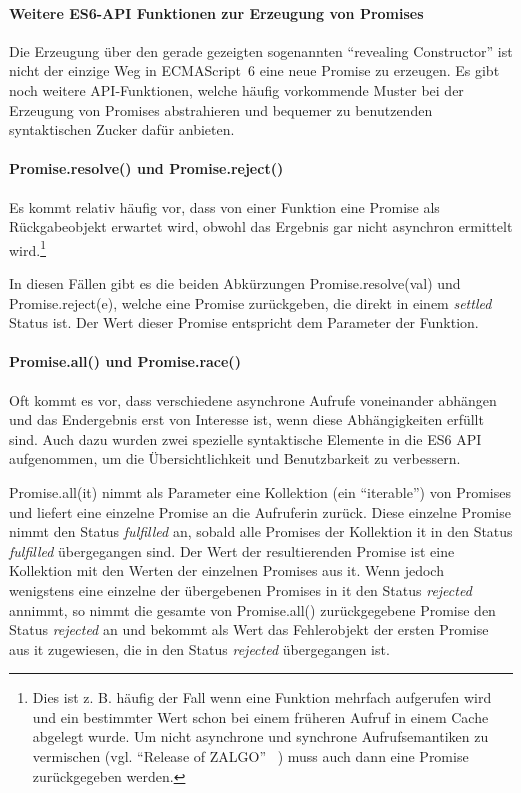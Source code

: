 \documentclass[
11pt, %
a4paper, %
oneside, %
pdfspacing, %
headinclude,
BCOR5mm, %
ngerman, %
bibtotocnumbered,
]{scrartcl}
\begin{document}
			\paragraph{Weitere ES6-API Funktionen zur Erzeugung von Promises}
			Die Erzeugung über den gerade gezeigten sogenannten "`re\-veal\-ing Constructor"' ist nicht der einzige Weg in ECMAScript~6 eine neue Promise zu erzeugen. Es gibt noch weitere API-Funktionen, welche häufig vorkommende Muster bei der Erzeugung von Promises abstrahieren und bequemer zu benutzenden syntaktischen Zucker dafür anbieten.
		
			\paragraph{\textsf{Promise.resolve()} und \textsf{Promise.reject()}} Es kommt relativ häufig vor, dass von einer Funktion eine Promise als Rückgabeobjekt erwartet wird, obwohl das Ergebnis gar nicht asynchron ermittelt wird.\footnote{Dies ist z. B. häufig der Fall wenn eine Funktion mehrfach aufgerufen wird und ein bestimmter Wert schon bei einem früheren Aufruf in einem Cache abgelegt wurde. Um nicht asynchrone und synchrone Aufrufsemantiken zu vermischen (vgl. "`Release of ZALGO"' ~\citep{Schlueter.2013}) muss auch dann eine Promise zurückgegeben werden.}
			
			In diesen Fällen gibt es die beiden Abkürzungen \textsf{Promise.resolve(val)} und \textsf{Promise.reject(e)}, welche eine Promise zurückgeben, die direkt in einem \emph{settled} Status ist. Der Wert dieser Promise entspricht dem Parameter der Funktion.
		
			\paragraph{\textsf{Promise.all()} und \textsf{Promise.race()}}
			Oft kommt es vor, dass verschiedene asynchrone Aufrufe voneinander abhängen und das Endergebnis erst von Interesse ist, wenn diese Abhängigkeiten erfüllt sind. Auch dazu wurden zwei spezielle syntaktische Elemente in die ES6 API aufgenommen, um die Übersichtlichkeit und Benutzbarkeit zu verbessern.
			
			\textsf{Promise.all(it)} nimmt als Parameter eine Kollektion (ein "`iterable"') von Promises und liefert eine einzelne Promise an die Aufruferin zurück. Diese einzelne Promise nimmt den Status \emph{fulfilled} an, sobald alle Promises der Kollektion \textsf{it} in den Status \emph{fulfilled} übergegangen sind. Der Wert der resultierenden Promise ist eine Kollektion mit den Werten der einzelnen Promises aus \textsf{it}. Wenn jedoch wenigstens eine einzelne der übergebenen Promises in \textsf{it} den Status \emph{rejected} annimmt, so nimmt die gesamte von \textsf{Promise.all()} zurückgegebene Promise den Status \emph{rejected} an und bekommt als Wert das Fehlerobjekt der ersten Promise aus \textsf{it} zugewiesen, die in den Status \emph{rejected} übergegangen ist.
			
\end{document}
